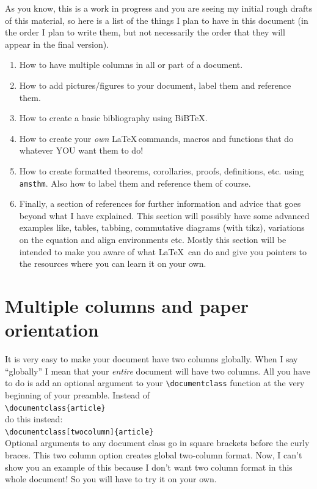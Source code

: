 \documentclass{article}
\newcommand{\nid}{\noindent} %
\begin{document}
As you know, this is a work in progress and you are seeing my initial rough drafts of this material, so here is a list of the things I plan to have in this document (in the order I plan to write them, but not necessarily the order that they will appear in the final version).
\begin{enumerate}
\item How to have multiple columns in all or part of a document.
\item How to add pictures/figures to your document, label them and reference them.
\item How to create a basic bibliography using BiB\TeX.
\item How to create your \emph{own} \LaTeX\,commands, macros and functions that do whatever YOU want them to do!
\item How to create formatted theorems, corollaries, proofs, definitions, etc. using \texttt{amsthm}. Also how to label them and reference them of course.
\item Finally, a section of references for further information and advice that goes beyond what I have explained.  This section will possibly have some advanced examples like, tables, tabbing, commutative diagrams (with tikz), variations on the equation and align environments etc.  Mostly this section will be intended to make you aware of what \LaTeX\, can do and give you pointers to the resources where you can learn it on your own.
\end{enumerate}

\section{Multiple columns and paper orientation}
It is very easy to make your document have two columns globally.  When I say ``globally'' I mean that your \emph{entire} document will have two columns.  All you have to do is add an optional argument to your \verb|\documentclass| function at the very beginning of your preamble.  Instead of \\

\verb|\documentclass{article}|\\

\nid do this instead:\\

\verb|\documentclass[twocolumn]{article}|\\

\nid Optional arguments to any document class go in square brackets before the curly braces.  This two column option creates global two-column format.  Now, I can't show you an example of this because I don't want two column format in this whole document!  So you will have to try it on your own.
\end{document}
